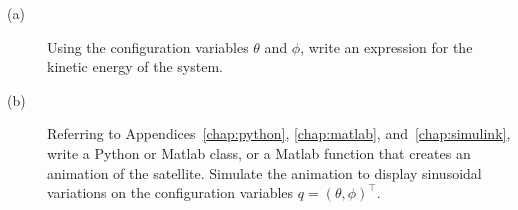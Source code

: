 \begin{description}
\item[(a)]  Using the configuration variables $\theta$ and $\phi$, write an expression for the kinetic energy of the system.
\item[(b)]  Referring to Appendices~\ref{chap:python}, \ref{chap:matlab}, and~\ref{chap:simulink}, write a Python or Matlab class, or a Matlab function that creates an animation of the satellite.  Simulate the animation to display sinusoidal variations on the configuration variables $q=(\theta, \phi)^\top$. 
\end{description}
